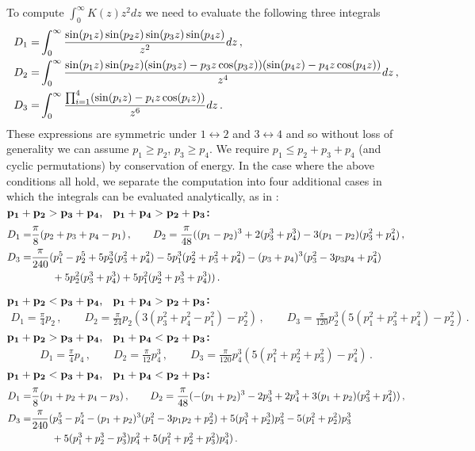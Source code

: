 To compute $\int_0^\infty K(z) z^2 dz$ we need to evaluate the following three integrals
\begin{align}
D_1=&\int_0^\infty \frac{\sin(p_1z)\sin(p_2z)\sin(p_3z)\sin(p_4z)}{z^2}dz\,,\\
D_2=&\int_0^\infty\frac{\sin(p_1z)\sin(p_2z)(\sin(p_3z)-p_3z\cos(p_3z))(\sin(p_4z)-p_4z\cos(p_4z))}{z^4}dz\,,\notag\\
D_3=&\int_0^\infty\frac{\prod_{i=1}^4(\sin(p_iz)-p_iz\cos(p_iz))}{z^6}dz\,.\notag
\end{align}
These expressions are symmetric under $1\leftrightarrow 2$ and $3\leftrightarrow 4$ and so without loss of generality we can assume $p_1\geq p_2$, $p_3\geq p_4$. We require $p_1\leq p_2+p_3+p_4$ (and cyclic permutations) by conservation of energy.  In the case where the above conditions all hold, we separate the computation into four additional cases in which the integrals can be evaluated analytically, as  in \cite{Dolgov:1997mb,Dolgov:1998sf}:\\
${\bf p_1+p_2>p_3+p_4\text{, \hspace{1mm} }p_1+p_4>p_2+p_3}${\bf :}
\begin{align}
D_1=&\frac{\pi}{8}(p_2+p_3+p_4-p_1)\,,\qquad
D_2=\frac{\pi}{48}((p_1-p_2)^3+2(p_3^3+p_4^3)-3(p_1-p_2)(p_3^2+p_4^2)\,, \\
D_3=&\frac{\pi}{240}(p_1^5-p_2^5+5p_2^3(p_3^2+p_4^2)-5p_1^3(p_2^2+p_3^2+p_4^2)-(p_3+p_4)^3(p_3^2-3p_3p_4+p_4^2)\notag\\
&\hspace{7mm}+5p_2^2(p_3^3+p_4^3)+5p_1^2(p_2^3+p_3^3+p_4^3))\,.\notag
\end{align}
${\bf p_1+p_2<p_3+p_4\text{, \hspace{1mm} }p_1+p_4>p_2+p_3}${\bf :}
\begin{align}
D_1= \frac{\pi }{4}p_2\,,\qquad
D_2= \frac{\pi }{24}p_2(3(p_3^2+p_4^2-p_1^2)-p_2^2)\,,\qquad 
D_3= \frac{\pi}{120}p_2^3(5(p_1^2+p_3^2+p_4^2)-p_2^2)\,. 
\end{align}
${\bf p_1+p_2>p_3+p_4\text{, \hspace{1mm} }p_1+p_4<p_2+p_3}${\bf :}
\begin{align}
D_1= \frac{\pi }{4}p_4\,,\qquad 
D_2= \frac{\pi}{12} p_4^3\,,\qquad 
D_3= \frac{\pi }{120}p_4^3(5(p_1^2+p_2^2+p_3^2)-p_4^2)\,. 
\end{align}
${\bf p_1+p_2<p_3+p_4\text{, \hspace{1mm} }p_1+p_4<p_2+p_3}${\bf :}
\begin{align}
D_1=&\frac{\pi}{8}(p_1+p_2+p_4-p_3)\,,\qquad
D_2= \frac{\pi}{48}(-(p_1+p_2)^3-2p_3^3+2p_4^3+3(p_1+p_2)(p_3^2+p_4^2))\,, \\
D_3=&\frac{\pi}{240}(p_3^5-p_4^5-(p_1+p_2)^3(p_1^2-3p_1p_2+p_2^2)+5(p_1^3+p_2^3)p_3^2-5(p_1^2+p_2^2)p_3^3\notag\\
&\hspace{7mm}+5(p_1^3+p_2^3-p_3^3)p_4^2+5(p_1^2+p_2^2+p_3^2)p_4^3)\,.\notag
\end{align}
